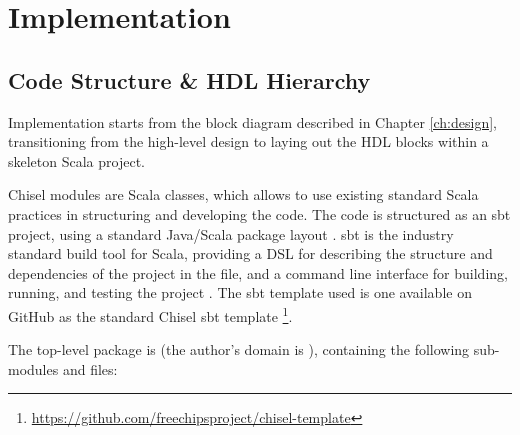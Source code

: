 \chapter{Implementation}
\label{ch:implementation}

\section{Code Structure \& HDL Hierarchy}
Implementation starts from the block diagram described in Chapter \ref{ch:design}, transitioning from the high-level design to laying out the HDL blocks within a skeleton Scala project.

Chisel modules are Scala classes, which allows to use existing standard Scala practices in structuring and developing the code. The code is structured as an sbt project, using a standard Java/Scala package layout \cite{scala_style}. sbt is the industry standard build tool for Scala, providing a DSL for describing the structure and dependencies of the project in the  file, and a command line interface for building, running, and testing the project \cite{sbt}. The sbt template used is one available on GitHub as the standard Chisel sbt template \footnote{\url{https://github.com/freechipsproject/chisel-template}}.

The top-level package is  (the author's domain is ), containing the following sub-modules and files:

